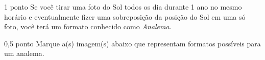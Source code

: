 \documentclass{../lista}
\begin{document}
	\begin{questao}{1 ponto}
		Se você tirar uma foto do Sol todos os dia durante 1 ano no mesmo horário e eventualmente fizer uma sobreposição da posição do Sol em uma só foto, você terá um formato conhecido como \textit{Analema}.

		\begin{pergunta}{0,5 ponto}
			Marque a(s) imagem(s) abaixo que representam formatos possíveis para um analema.



\end{pergunta}
\end{questao}
\end{document}
